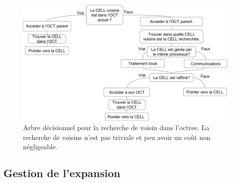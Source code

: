 \begin{figure}
        \includegraphics[width=\linewidth]{img/02/voisins.pdf} 
        \caption[Recherche de voisin dans l'octree.]{Arbre décisionnel pour la recherche de voisin dans l'octree.
        La recherche de voisins n'est pas triviale et peu avoir un coût non négligeable.
     	\label{fig:voisin} }
\end{figure}

%
%

\subsection{Gestion de l'expansion}
\label{sec:supercomobil}



